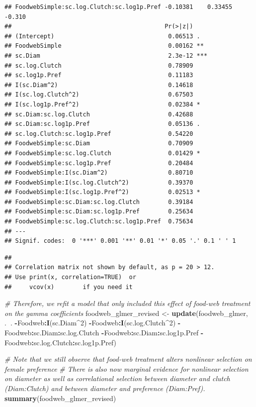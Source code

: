 \documentclass[]{elsarticle} %
\newenvironment{Shaded}{\begin{snugshade}}{\end{snugshade}}
\newcommand{\KeywordTok}[1]{\textcolor[rgb]{0.13,0.29,0.53}{\textbf{#1}}}
\newcommand{\DecValTok}[1]{\textcolor[rgb]{0.00,0.00,0.81}{#1}}
\newcommand{\StringTok}[1]{\textcolor[rgb]{0.31,0.60,0.02}{#1}}
\newcommand{\CommentTok}[1]{\textcolor[rgb]{0.56,0.35,0.01}{\textit{#1}}}
\newcommand{\OperatorTok}[1]{\textcolor[rgb]{0.81,0.36,0.00}{\textbf{#1}}}
\newcommand{\NormalTok}[1]{#1}
\begin{document}
\begin{verbatim}
## FoodwebSimple:sc.log.Clutch:sc.log1p.Pref -0.10381    0.33455  -0.310
##                                           Pr(>|z|)    
## (Intercept)                                0.06513 .  
## FoodwebSimple                              0.00162 ** 
## sc.Diam                                    2.3e-12 ***
## sc.log.Clutch                              0.78909    
## sc.log1p.Pref                              0.11183    
## I(sc.Diam^2)                               0.14618    
## I(sc.log.Clutch^2)                         0.67503    
## I(sc.log1p.Pref^2)                         0.02384 *  
## sc.Diam:sc.log.Clutch                      0.42688    
## sc.Diam:sc.log1p.Pref                      0.05136 .  
## sc.log.Clutch:sc.log1p.Pref                0.54220    
## FoodwebSimple:sc.Diam                      0.70909    
## FoodwebSimple:sc.log.Clutch                0.01429 *  
## FoodwebSimple:sc.log1p.Pref                0.20484    
## FoodwebSimple:I(sc.Diam^2)                 0.80710    
## FoodwebSimple:I(sc.log.Clutch^2)           0.39370    
## FoodwebSimple:I(sc.log1p.Pref^2)           0.02513 *  
## FoodwebSimple:sc.Diam:sc.log.Clutch        0.39184    
## FoodwebSimple:sc.Diam:sc.log1p.Pref        0.25634    
## FoodwebSimple:sc.log.Clutch:sc.log1p.Pref  0.75634    
## ---
## Signif. codes:  0 '***' 0.001 '**' 0.01 '*' 0.05 '.' 0.1 ' ' 1
\end{verbatim}

\begin{verbatim}
## 
## Correlation matrix not shown by default, as p = 20 > 12.
## Use print(x, correlation=TRUE)  or
##     vcov(x)        if you need it
\end{verbatim}

\begin{Shaded}
\begin{Highlighting}[]
\CommentTok{# Therefore, we refit a model that only included this effect of food-web treatment on the gamma coefficients}
\NormalTok{foodweb_glmer_revised <-}\StringTok{ }\KeywordTok{update}\NormalTok{(foodweb_glmer, .}\OperatorTok{~}\NormalTok{. }\OperatorTok{-}\NormalTok{Foodweb}\OperatorTok{:}\KeywordTok{I}\NormalTok{(sc.Diam}\OperatorTok{^}\DecValTok{2}\NormalTok{) }\OperatorTok{-}\NormalTok{Foodweb}\OperatorTok{:}\KeywordTok{I}\NormalTok{(sc.log.Clutch}\OperatorTok{^}\DecValTok{2}\NormalTok{) }\OperatorTok{-}\NormalTok{Foodweb}\OperatorTok{:}\NormalTok{sc.Diam}\OperatorTok{:}\NormalTok{sc.log.Clutch }\OperatorTok{-}\NormalTok{Foodweb}\OperatorTok{:}\NormalTok{sc.Diam}\OperatorTok{:}\NormalTok{sc.log1p.Pref }\OperatorTok{-}\NormalTok{Foodweb}\OperatorTok{:}\NormalTok{sc.log.Clutch}\OperatorTok{:}\NormalTok{sc.log1p.Pref)}

\CommentTok{# Note that we still observe that food-web treatment alters nonlinear selection on female preference}
\CommentTok{# There is also now marginal evidence for nonlinear selection on diameter as well as correlational selection between diameter and clutch (Diam:Clutch) and between diameter and preference (Diam:Pref).}
\KeywordTok{summary}\NormalTok{(foodweb_glmer_revised)}
\end{Highlighting}
\end{Shaded}
\end{document}
